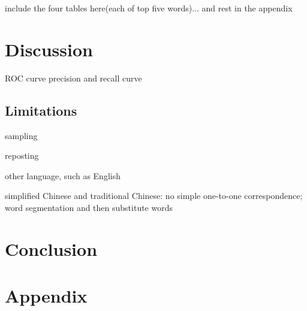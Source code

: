 \documentclass[11pt]{article}
\newcommand{\1}[1]{{\mathbf 1}\left\{#1\right\}}        %
\begin{document}
include the four tables here(each of top five words)... and rest in the appendix



\section{Discussion}

ROC curve
precision and recall curve

\subsection{Limitations}

sampling \cite{boyd2004fastest} \cite{leskovec2006sampling}  \cite{wang2011understanding}

reposting

other language, such as English

simplified Chinese and traditional Chinese: no simple one-to-one correspondence; word segmentation and then substitute words



\section{Conclusion}



%


\newpage




\newpage
\section{Appendix}

\end{document}
